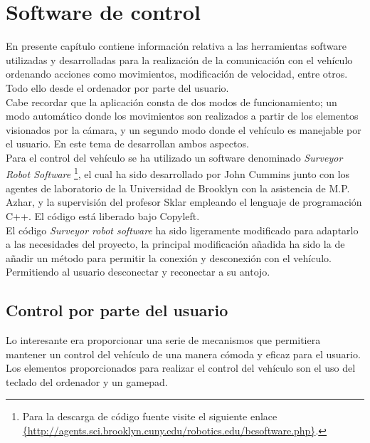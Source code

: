

\chapter{Software de control}
\label{chap:software-de-control}

En presente capítulo contiene información relativa a las herramientas software utilizadas y desarrolladas para la realización de la comunicación con el vehículo ordenando acciones como movimientos, modificación de velocidad, entre otros. Todo ello desde el ordenador por parte del usuario.\\

Cabe recordar que la aplicación consta de dos modos de funcionamiento; un modo automático donde los movimientos son realizados a partir de los elementos visionados por la cámara, y un segundo modo donde el vehículo es manejable por el usuario. En este tema de desarrollan ambos aspectos.\\

Para el control del vehículo se ha utilizado un software denominado \emph{Surveyor Robot Software} \footnote{Para la descarga de código fuente visite el siguiente enlace \url{{http://agents.sci.brooklyn.cuny.edu/robotics.edu/bcsoftware.php}}.}, el cual ha sido desarrollado por John Cummins junto con los agentes de laboratorio de la Universidad de Brooklyn con la asistencia de M.P. Azhar, y la supervisión del profesor Sklar empleando el lenguaje de programación C++. El código está liberado bajo Copyleft.\\

El código \emph{Surveyor robot software} ha sido ligeramente modificado para adaptarlo a las necesidades del proyecto, la principal modificación añadida ha sido la de añadir un método para permitir la conexión y desconexión con el vehículo. Permitiendo al usuario desconectar y reconectar a su antojo.

\section{Control por parte del usuario}

Lo interesante era proporcionar una serie de mecanismos que permitiera mantener un control del vehículo de una manera cómoda y eficaz para el usuario. Los elementos proporcionados para realizar el control del vehículo son el uso del teclado del ordenador y un gamepad.

